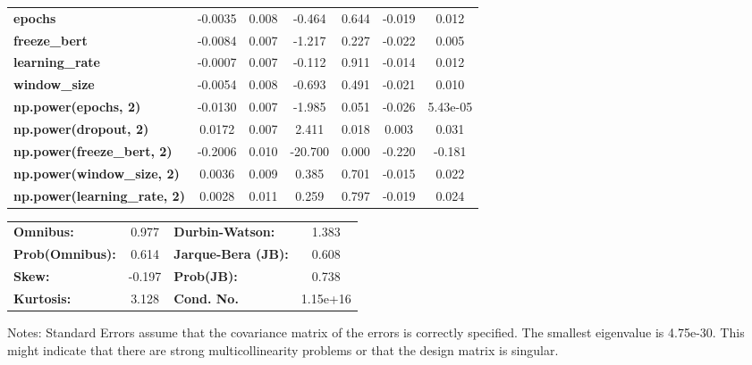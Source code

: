 \begin{center}
\begin{tabular}{lcccccc}
\textbf{epochs}                            &      -0.0035  &        0.008     &    -0.464  &         0.644        &       -0.019    &        0.012     \\
\textbf{freeze\_bert}                      &      -0.0084  &        0.007     &    -1.217  &         0.227        &       -0.022    &        0.005     \\
\textbf{learning\_rate}                    &      -0.0007  &        0.007     &    -0.112  &         0.911        &       -0.014    &        0.012     \\
\textbf{window\_size}                      &      -0.0054  &        0.008     &    -0.693  &         0.491        &       -0.021    &        0.010     \\
\textbf{np.power(epochs, 2)}               &      -0.0130  &        0.007     &    -1.985  &         0.051        &       -0.026    &     5.43e-05     \\
\textbf{np.power(dropout, 2)}              &       0.0172  &        0.007     &     2.411  &         0.018        &        0.003    &        0.031     \\
\textbf{np.power(freeze\_bert, 2)}         &      -0.2006  &        0.010     &   -20.700  &         0.000        &       -0.220    &       -0.181     \\
\textbf{np.power(window\_size, 2)}         &       0.0036  &        0.009     &     0.385  &         0.701        &       -0.015    &        0.022     \\
\textbf{np.power(learning\_rate, 2)}       &       0.0028  &        0.011     &     0.259  &         0.797        &       -0.019    &        0.024     \\
\bottomrule
\end{tabular}
\begin{tabular}{lclc}
\textbf{Omnibus:}       &  0.977 & \textbf{  Durbin-Watson:     } &    1.383  \\
\textbf{Prob(Omnibus):} &  0.614 & \textbf{  Jarque-Bera (JB):  } &    0.608  \\
\textbf{Skew:}          & -0.197 & \textbf{  Prob(JB):          } &    0.738  \\
\textbf{Kurtosis:}      &  3.128 & \textbf{  Cond. No.          } & 1.15e+16  \\
\bottomrule
\end{tabular}
\end{center}

Notes: \newline
 [1] Standard Errors assume that the covariance matrix of the errors is correctly specified. \newline
 [2] The smallest eigenvalue is 4.75e-30. This might indicate that there are \newline
 strong multicollinearity problems or that the design matrix is singular.